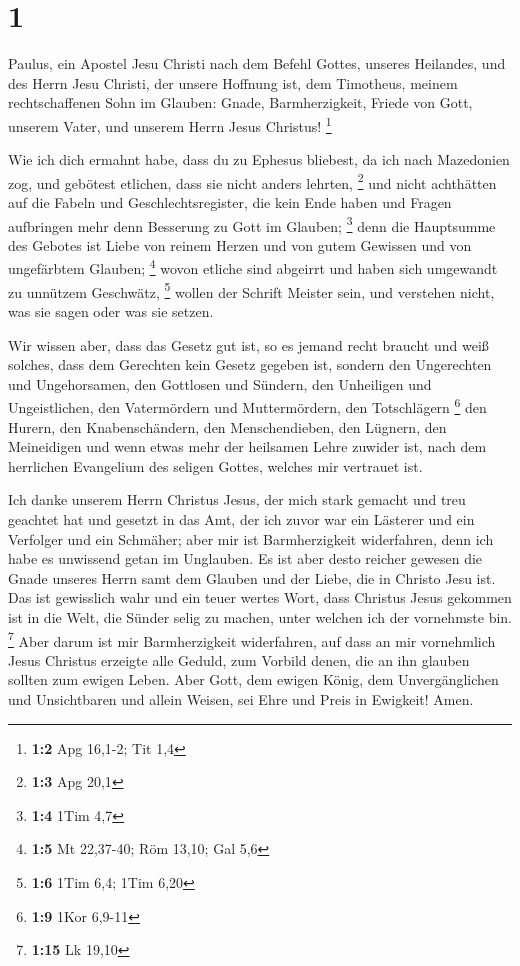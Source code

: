 \hypertarget{section}{%
\section{1}\label{section}}

 Paulus, ein Apostel Jesu Christi nach dem Befehl Gottes,
unseres Heilandes, und des Herrn Jesu Christi, der unsere Hoffnung ist,
 dem Timotheus, meinem rechtschaffenen Sohn im Glauben:
Gnade, Barmherzigkeit, Friede von Gott, unserem Vater, und unserem Herrn
Jesus Christus! \footnote{\textbf{1:2} Apg 16,1-2; Tit 1,4}

 Wie ich dich ermahnt habe, dass du zu Ephesus bliebest,
da ich nach Mazedonien zog, und gebötest etlichen, dass sie nicht anders
lehrten, \footnote{\textbf{1:3} Apg 20,1}  und nicht
achthätten auf die Fabeln und Geschlechtsregister, die kein Ende haben
und Fragen aufbringen mehr denn Besserung zu Gott im Glauben;
\footnote{\textbf{1:4} 1Tim 4,7}  denn die Hauptsumme des
Gebotes ist Liebe von reinem Herzen und von gutem Gewissen und von
ungefärbtem Glauben; \footnote{\textbf{1:5} Mt 22,37-40; Röm 13,10; Gal
  5,6}  wovon etliche sind abgeirrt und haben sich
umgewandt zu unnützem Geschwätz, \footnote{\textbf{1:6} 1Tim 6,4; 1Tim
  6,20}  wollen der Schrift Meister sein, und verstehen
nicht, was sie sagen oder was sie setzen.

 Wir wissen aber, dass das Gesetz gut ist, so es jemand
recht braucht  und weiß solches, dass dem Gerechten kein
Gesetz gegeben ist, sondern den Ungerechten und Ungehorsamen, den
Gottlosen und Sündern, den Unheiligen und Ungeistlichen, den
Vatermördern und Muttermördern, den Totschlägern \footnote{\textbf{1:9}
  1Kor 6,9-11}  den Hurern, den Knabenschändern, den
Menschendieben, den Lügnern, den Meineidigen und wenn etwas mehr der
heilsamen Lehre zuwider ist,  nach dem herrlichen
Evangelium des seligen Gottes, welches mir vertrauet ist.

 Ich danke unserem Herrn Christus Jesus, der mich stark
gemacht und treu geachtet hat und gesetzt in das Amt, 
der ich zuvor war ein Lästerer und ein Verfolger und ein Schmäher; aber
mir ist Barmherzigkeit widerfahren, denn ich habe es unwissend getan im
Unglauben.  Es ist aber desto reicher gewesen die Gnade
unseres Herrn samt dem Glauben und der Liebe, die in Christo Jesu ist.
 Das ist gewisslich wahr und ein teuer wertes Wort, dass
Christus Jesus gekommen ist in die Welt, die Sünder selig zu machen,
unter welchen ich der vornehmste bin. \footnote{\textbf{1:15} Lk 19,10}
 Aber darum ist mir Barmherzigkeit widerfahren, auf dass
an mir vornehmlich Jesus Christus erzeigte alle Geduld, zum Vorbild
denen, die an ihn glauben sollten zum ewigen Leben.  Aber
Gott, dem ewigen König, dem Unvergänglichen und Unsichtbaren und allein
Weisen, sei Ehre und Preis in Ewigkeit! Amen.

